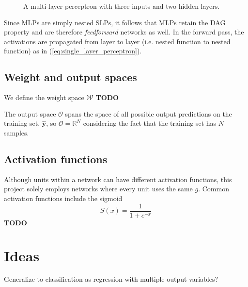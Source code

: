 \documentclass{report}
\renewcommand\vec{\mathbf}
\newcommand{\todo}{{\color{red} \textbf{TODO} }}
\begin{document}
\begin{figure}[h]
\begin{center}
    \end{center}
    \caption{A multi-layer perceptron with three inputs and two hidden layers.}
    \label{fig:multi_layer_perceptron}
\end{figure}

Since MLPs are simply nested SLPs, it follows that MLPs retain the DAG property and are therefore \textit{feedforward} networks as well.
In the forward pass, the activations are propagated from layer to layer (i.e. nested function to nested function) as in (\ref{eq:single_layer_perceptron}).

\section{Weight and output spaces}
We define the weight space $\mathcal{W}$ \todo

The output space $\mathcal{O}$ spans the space of all possible output predictions on the training set, $\vec{\hat{y}}$, so $\mathcal{O}=\mathbb{R}^N$ considering the fact that the training set has $N$ samples.

\section{Activation functions}
\label{sec:activation_functions}
Although units within a network can have different activation functions, this project solely employs networks where every unit uses the same $g$. 
Common activation functions include the sigmoid
\begin{equation}
    S(x) = \frac{1}{1 + e^{-x}}
\end{equation}
\todo

\chapter*{Ideas}
Generalize to classification as regression with multiple output variables?



\end{document}
